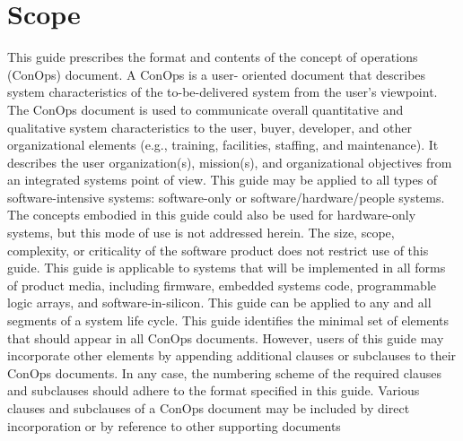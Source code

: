 \section{Scope}

This guide prescribes the format and contents of the concept of operations (ConOps) document. A ConOps is a user-
oriented document that describes system characteristics of the to-be-delivered system from the user’s viewpoint. The
ConOps document is used to communicate overall quantitative and qualitative system characteristics to the user, buyer,
developer, and other organizational elements (e.g., training, facilities, staffing, and maintenance). It describes the user
organization(s), mission(s), and organizational objectives from an integrated systems point of view.
This guide may be applied to all types of software-intensive systems: software-only or software/hardware/people
systems. The concepts embodied in this guide could also be used for hardware-only systems, but this mode of use is
not addressed herein. The size, scope, complexity, or criticality of the software product does not restrict use of this
guide. This guide is applicable to systems that will be implemented in all forms of product media, including firmware,
embedded systems code, programmable logic arrays, and software-in-silicon. This guide can be applied to any and all
segments of a system life cycle.
This guide identifies the minimal set of elements that should appear in all ConOps documents. However, users of this
guide may incorporate other elements by appending additional clauses or subclauses to their ConOps documents. In
any case, the numbering scheme of the required clauses and subclauses should adhere to the format specified in this
guide. Various clauses and subclauses of a ConOps document may be included by direct incorporation or by reference
to other supporting documents

